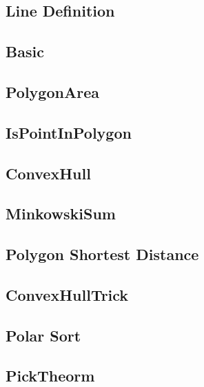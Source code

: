 \subsection{Line Definition}


\subsection{Basic}


\subsection{PolygonArea}


\subsection{IsPointInPolygon}


\subsection{ConvexHull}


\subsection{MinkowskiSum}


\subsection{Polygon Shortest Distance}


\subsection{ConvexHullTrick}


\subsection{Polar Sort}


\subsection{PickTheorm}


